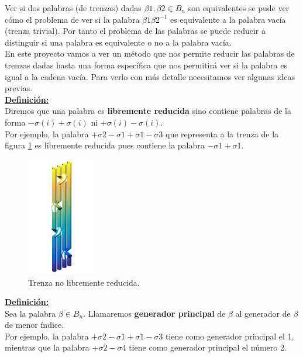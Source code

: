 \documentclass[14pt]{extarticle}
\begin{document}
Ver si dos palabras (de trenzas) dadas $\beta1, \beta2 \in B_{n}$ son equivalentes se pude ver cómo el problema de ver si la palabra $\beta1\beta2^{-1}$ es equivalente a la palabra vacía (trenza trivial). Por tanto el problema de las palabras se puede reducir a distinguir si una palabra es equivalente o no a la palabra vacía. \\

En este proyecto vamos a ver un método que nos permite reducir las palabras de trenzas dadas hasta una forma específica que nos permitirá ver si la palabra es igual a la cadena vacía. Para verlo con más detalle necesitamos ver algunas ideas previas.\\

\underline{\textbf{Definición:}}\\
Diremos que una palabra es \textbf{libremente reducida} sino contiene palabras de la forma $ -\sigma(i)+\sigma(i) $ ni $+\sigma(i)-\sigma(i)$.\\

Por ejemplo, la palabra $+\sigma2-\sigma1+\sigma1-\sigma3$ que representa a la trenza de la figura \ref{deh1} es libremente reducida pues contiene la palabra $-\sigma1+\sigma1$.\\

	\begin{figure}[h!]
		\centering
		\includegraphics[width=3cm]{itrenzas/deh1.png}
		\caption{Trenza no libremente reducida.}
		\label{deh1} 
	\end{figure}

\underline{\textbf{Definición:}}\\
Sea la palabra $\beta \in B_{n}$. Llamaremos \textbf{generador principal} de $\beta$ al generador de $\beta$ de menor índice.\\

Por ejemplo, la palabra $+\sigma2-\sigma1+\sigma1-\sigma3$ tiene como generador principal el 1, mientras que la palabra $+\sigma2-\sigma4$ tiene como generador principal el número 2. \\
\end{document}
